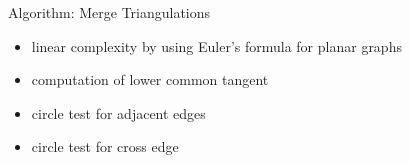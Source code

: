 \documentclass[aspectratio=169,fleqn]{beamer}
\begin{document}
\begin{frame}{Algorithm: Merge Triangulations}
\begin{mybox}
\begin{enumerate}
      \end{enumerate}
    \end{mybox}
    \begin{itemize}
      \item linear complexity by using Euler's formula for planar graphs
      \item computation of lower common tangent
      \item circle test for adjacent edges
      \item circle test for cross edge
    \end{itemize}
  \end{frame}


\end{document}
